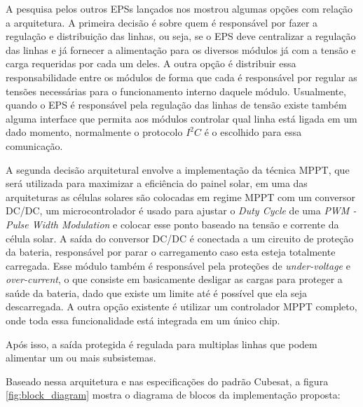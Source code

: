 A pesquisa pelos outros EPSs lançados nos mostrou algumas opções com relação a arquitetura. A primeira decisão é sobre quem é responsável por fazer a regulação e distribuição das linhas, ou seja, se o EPS deve centralizar a regulação das linhas e já fornecer a alimentação para os diversos módulos já com a tensão e carga requeridas por cada um deles. A outra opção é distribuir essa responsabilidade entre os módulos de forma que cada é responsável por regular as tensões necessárias para o funcionamento interno daquele módulo. Usualmente, quando o EPS é responsável pela regulação das linhas de tensão existe também alguma interface que permita aos módulos controlar qual linha está ligada em um dado momento, normalmente o protocolo $I^{2}C$ é o escolhido para essa comunicação.

A segunda decisão arquitetural envolve a implementação da técnica MPPT, que será utilizada para maximizar a eficiência do painel solar, em uma das arquiteturas as células solares são colocadas em regime MPPT com um conversor DC/DC, um microcontrolador é usado para ajustar o \textit{Duty Cycle} de uma \textit{PWM - Pulse Width Modulation} e colocar esse ponto baseado na tensão e corrente da célula solar. A saída do conversor DC/DC é conectada a um circuito de proteção da bateria, responsável por parar o carregamento caso esta esteja totalmente carregada. Esse módulo também é responsável pela proteções de \textit{under-voltage} e \textit{over-current}, o que consiste em basicamente desligar as cargas para proteger a saúde da bateria, dado que existe um limite até é possível que ela seja descarregada. A outra opção existente é utilizar um controlador MPPT completo, onde toda essa funcionalidade está integrada em um único chip.

Após isso, a saída protegida é regulada para multiplas linhas que podem alimentar um ou mais subsistemas. 

Baseado nessa arquitetura e nas especificações do padrão Cubesat, a figura \ref{fig:block_diagram} mostra o diagrama de blocos da implementação proposta:

\noindent
\begin{minipage}{\linewidth}
\label{fig:block_diagram}
\end{minipage}

